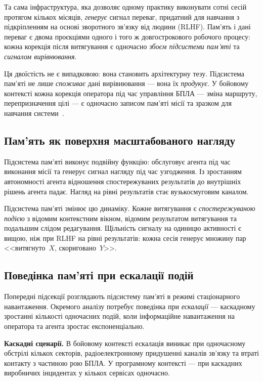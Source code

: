 \documentclass[11pt]{article}
\begin{document}
Та сама інфраструктура, яка дозволяє одному практику виконувати сотні сесій протягом кількох місяців, \emph{генерує} сигнал переваг, придатний для навчання з підкріпленням на основі зворотного зв'язку від людини (RLHF).
Пам'ять і дані переваг є двома проєкціями одного і того ж довгострокового робочого процесу: кожна корекція після витягування є одночасно \emph{збоєм підсистеми пам'яті} та \emph{сигналом вирівнювання}.

Ця двоїстість не є випадковою: вона становить архітектурну тезу.
Підсистема пам'яті не лише \emph{споживає} дані вирівнювання --- вона їх \emph{продукує}.
У бойовому контексті кожна корекція оператора під час управління БПЛА --- зміна маршруту, перепризначення цілі --- є одночасно записом пам'яті місії та зразком для навчання системи~\citep{ovcharov2026edittrace}.

\subsection{Пам'ять як поверхня масштабованого нагляду}
\label{sec:disc-oversight-surface}

Підсистема пам'яті виконує подвійну функцію: обслуговує агента під час виконання місії та генерує сигнал нагляду під час узгодження.
Із зростанням автономності агента відношення спостережуваних результатів до внутрішніх рішень агента падає.
Нагляд на рівні результатів стає вузькосмуговим каналом.

Підсистема пам'яті змінює цю динаміку.
Кожне витягування є \emph{спостережуваною подією} з відомим контекстним вікном, відомим результатом витягування та подальшим слідом редагування.
Щільність сигналу на одиницю активності є вищою, ніж при RLHF на рівні результатів: кожна сесія генерує множину пар <<витягнуто~$X$, скориговано~$Y$>>.

\subsection{Поведінка пам'яті при ескалації подій}
\label{sec:disc-escalation}

Попередні підсекції розглядають підсистему пам'яті в режимі стаціонарного навантаження.
Окремого аналізу потребує поведінка при \emph{ескалації} --- каскадному зростанні кількості одночасних подій, коли інформаційне навантаження на оператора та агента зростає експоненціально.

\textbf{Каскадні сценарії.}
В бойовому контексті ескалація виникає при одночасному обстрілі кількох секторів, радіоелектронному придушенні каналів зв'язку та втраті контакту з частиною рою БПЛА.
У програмному контексті --- при каскадних виробничих інцидентах у кількох сервісах одночасно.
\end{document}
